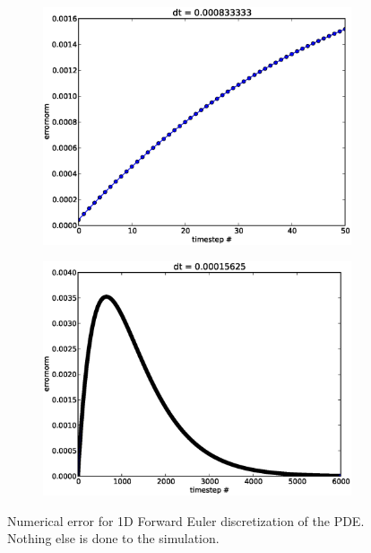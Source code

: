 \begin{figure}[H]
\centering
\begin{subfigure}[b]{0.48\textwidth}
\includegraphics[width=\textwidth]{../doc/results/experiment_31102013_1017/results/deterministic_errorplot.eps}
\caption{}
\label{errorplot_FE1D_noWalk}
\end{subfigure}
\begin{subfigure}[b]{0.48\textwidth}
 \includegraphics[width=\textwidth]{../doc/results/experiment_18112013_0830/results/deterministic_errorplot.eps}
 \caption{}
 \label{errorplot_FE1D_noWalk_long}
\end{subfigure}
\caption[Numerical error for 1D Forward Euler discretization]{Numerical error for 1D Forward Euler discretization of the PDE. Nothing else is done to the simulation.}
\label{errorplot_FE1D_noWalk_super}
\end{figure}


